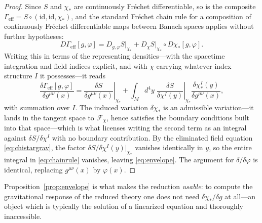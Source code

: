 \documentclass[11pt,reqno]{amsart}
\numberwithin{equation}{section}
\theoremstyle{plain}
\theoremstyle{definition}
\theoremstyle{remark}
\newcommand{\Geff}{\Gamma_{\mathrm{eff}}}
\begin{document}
\begin{proof}
Since $S$ and $\chi_{*}$ are continuously Fr\'echet differentiable, so is the composite
$\Geff=S\circ(\mathrm{id},\mathrm{id},\chi_{*})$, and the standard Fr\'echet chain rule for a
composition of continuously Fr\'echet differentiable maps between Banach spaces
\cite[Ch.~4]{Zeidler1} applies without further hypotheses:
\[
D\Geff[g,\varphi]=D_{g,\varphi}S\big|_{\chi_{*}}
+D_{\chi}S\big|_{\chi_{*}}\circ D\chi_{*}[g,\varphi] .
\]
Writing this in terms of the
representing densities---with the spacetime integration and field indices explicit, and with
$\chi$ carrying whatever index structure $I$ it possesses---it reads
\begin{equation}
\label{eq:chainrule}
\frac{\delta\Geff[g,\varphi]}{\delta g^{\mu\nu}(x)}
=\left.\frac{\delta S}{\delta g^{\mu\nu}(x)}\right|_{\chi_{*}}
+\int_{M}\!d^{4}y\;
\left.\frac{\delta S}{\delta\chi^{I}(y)}\right|_{\chi_{*}}
\frac{\delta\chi_{*}^{I}(y)}{\delta g^{\mu\nu}(x)} ,
\end{equation}
with summation over $I$. The induced variation $\delta\chi_{*}$ is an admissible variation---it
lands in the tangent space to $\mathcal{F}_{\chi}$, hence satisfies the boundary conditions
built into that space---which is what licenses writing the second term as an integral against
$\delta S/\delta\chi^{I}$ with no boundary contribution. By the eliminated field equation
\eqref{eq:chistargrav}, the
factor $\delta S/\delta\chi^{I}(y)\big|_{\chi_{*}}$ vanishes identically in $y$, so the entire
integral in \eqref{eq:chainrule} vanishes, leaving \eqref{eq:envelope}. The argument for
$\delta/\delta\varphi$ is identical, replacing $g^{\mu\nu}(x)$ by $\varphi(x)$.
\end{proof}

Proposition~\ref{prop:envelope} is what makes the reduction \emph{usable}: to compute the
gravitational response of the reduced theory one does not need $\delta\chi_{*}/\delta g$ at
all---an object which is typically the solution of a linearized equation and thoroughly
inaccessible.
\end{document}
